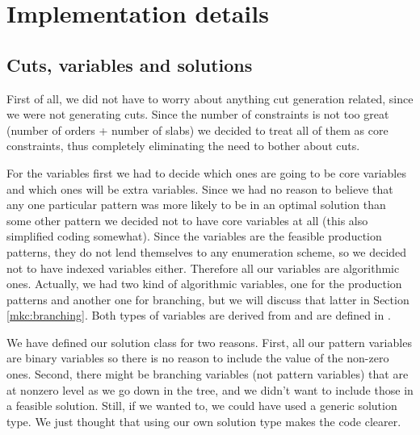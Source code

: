 \section{Implementation details}

\subsection{Cuts, variables and solutions}
First of all, we did not have to worry about anything cut generation related,
since we were not generating cuts. Since the number of constraints is not too
great (number of orders + number of slabs) we decided to treat all of them as
core constraints, thus completely eliminating the need to bother about cuts.

For the variables first we had to decide which ones are going to be core
variables and which ones will be extra variables. Since we had no
reason to believe that any one particular pattern was more likely to be in
an optimal solution than some other pattern we decided not to have core
variables at all (this also simplified coding somewhat). Since the variables
are the feasible production patterns, they do not lend themselves to any
enumeration scheme, so we decided not to have indexed variables either.
Therefore all our variables are algorithmic ones. Actually, we had two kind of
algorithmic variables, one for the production patterns and another one for
branching, but we will discuss that latter in Section \ref{mkc:branching}. Both
types of variables are derived from  and are defined in
.

We have defined our solution class for two reasons. First, all our pattern
variables are binary variables so there is no reason to include the value of
the non-zero ones. Second, there might be branching variables (not pattern
variables) that are at nonzero level as we go down in the tree, and we didn't
want to include those in a feasible solution. Still, if we wanted to, we could
have used a generic solution type. We just thought that using our own solution
type makes the code clearer. 


